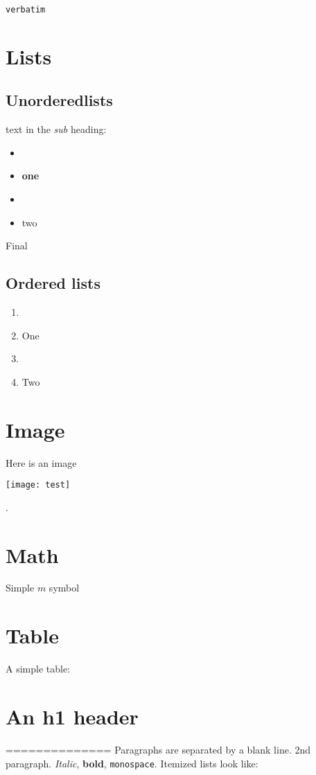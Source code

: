 \begin{verbatim}
verbatim
\end{verbatim}
\section{Lists}
\subsection{Unorderedlists}
text in the \emph{sub} heading:

\begin{itemize}
\item \item \textbf{one}

\item \item two

\end{itemize}

Final
\subsection{Ordered lists}

\begin{enumerate}
\item \item One

\item \item Two

\end{enumerate}

\section{Image}
Here is an image 
\begin{center}
\texttt{[image: test]}
\end{center}
.
\section{Math}
Simple $m$ symbol
\section{Table}
A simple table:
\section{An h1 header}
==============
Paragraphs are separated by a blank line.
2nd paragraph. \emph{Italic}, \textbf{bold}, \lstinline!monospace!. Itemized lists
look like:


